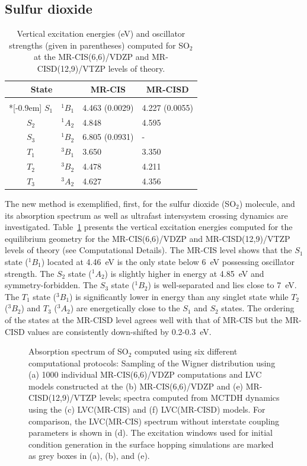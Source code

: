 \documentclass[twoside,twocolumn,9pt]{article}
\begin{document}
\subsection{Sulfur dioxide}
%
\begin{table}
\caption{Vertical excitation energies (eV) and oscillator strengths (given in parentheses) computed for SO$_2$ at the MR-CIS(6,6)/VDZP and MR-CISD(12,9)/VTZP levels of theory.}
\label{tab:vert}

\begin{tabular}[bth!]{ccll}
\hline
\multicolumn{2}{c}{State} & \multicolumn{1}{c}{MR-CIS} & \multicolumn{1}{c}{MR-CISD} \\
\hline
&& \\*[-0.9em]
$S_1$ & $^1B_1$ & 4.463 (0.0029) & 4.227 (0.0055) \\
$S_2$ & $^1A_2$ & 4.848 &  4.595 \\
$S_3$ & $^1B_2$ & 6.805 (0.0931) & - \\ %
$T_1$ & $^3B_1$ & 3.650 & 3.350 \\
$T_2$ & $^3B_2$ & 4.478 & 4.211  \\
$T_3$ & $^3A_2$ & 4.627 & 4.356 \\
\hline
\end{tabular}
\end{table}
%
The new method is exemplified, first, for the sulfur dioxide (SO$_2$) molecule, and its absorption spectrum as well as ultrafast intersystem crossing dynamics are investigated.
Table~\ref{tab:vert} presents the vertical excitation energies computed for the equilibrium geometry for the MR-CIS(6,6)/VDZP and MR-CISD(12,9)/VTZP levels of theory (see Computational Details).
The MR-CIS level shows that the $S_1$ state ($^1B_1$) located at 4.46~eV is the only state below 6~eV possessing oscillator strength.
The $S_2$ state ($^1A_2$) is slightly higher in energy at 4.85~eV and symmetry-forbidden.
The $S_3$ state ($^1B_2$) is well-separated and lies close to 7~eV.
The $T_1$ state ($^3B_1$) is significantly lower in energy than any singlet state while $T_2$ ($^3B_2$) and $T_3$ ($^3A_2$) are energetically close to the $S_1$ and $S_2$ states.
The ordering of the states at the MR-CISD level agrees well with that of MR-CIS but the MR-CISD values are consistently down-shifted by 0.2-0.3~eV.

\begin{figure}[hbt!]
\caption{Absorption spectrum of SO$_2$ computed using six different computational protocols: Sampling of the Wigner distribution using (a) 1000 individual MR-CIS(6,6)/VDZP computations and LVC models constructed at the (b) MR-CIS(6,6)/VDZP and (e) MR-CISD(12,9)/VTZP levels; spectra computed from MCTDH dynamics using the (c) LVC(MR-CIS) and (f) LVC(MR-CISD) models.
For comparison, the LVC(MR-CIS) spectrum without interstate coupling parameters is shown in (d).
The excitation windows used for initial condition generation in the surface hopping simulations are marked as grey boxes in (a), (b), and (e).}
\label{fig:spectra}
\end{figure}
\end{document}

